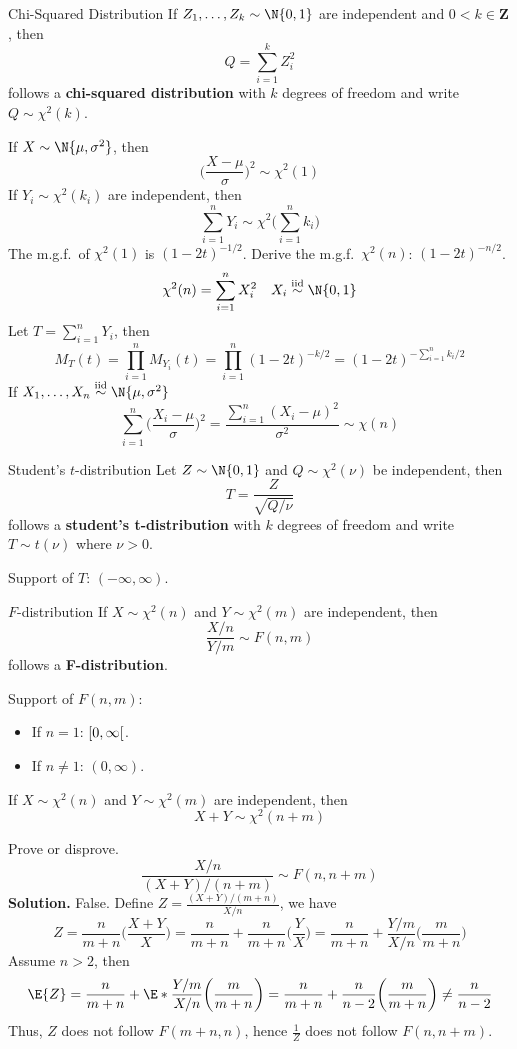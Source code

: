\begin{Definition}{Chi-Squared Distribution}{}
    If $ Z_1,\ldots,Z_k \sim \N{0,1} $ are independent
    and $ 0<k\in\mathbf{Z} $, then
    \[ Q=\sum_{i=1}^{k} Z_i^2 \]
    follows a \textbf{chi-squared distribution}
    with $ k $ degrees of freedom and write
    $ Q \sim \chi^2(k) $.
\end{Definition}
If $ X \sim \N{\mu,\sigma^2} $, then
\[ \biggl(\frac{X-\mu}{\sigma}\biggr)^2 \sim \chi^2(1)  \]
If $ Y_i \sim \chi^2(k_i) $ are independent, then
\[ \sum_{i=1}^{n} Y_i \sim \chi^2\biggl(\sum_{i=1}^{n} k_i\biggr) \]
The m.g.f.\ of $ \chi^2(1) $ is $ (1-2t)^{-1/2} $. Derive
the m.g.f.\ $ \chi^2(n) $: $ (1-2t)^{-n/2} $.
\[ \chi^2(n)=\sum_{i=1}^{n} X_i^2\quad X_i\stackrel{\text{iid}}{\sim}\N{0,1}\]
Let $ T=\sum_{i=1}^{n} Y_i $, then
\[
    M_T(t)
    =\prod_{i=1}^n M_{Y_i}(t)
    =\prod_{i=1}^n(1-2t)^{-k/2}
    =(1-2t)^{-\sum_{i=1}^{n} k_i/2}
\]
If $ X_1,\ldots,X_n\stackrel{\text{iid}}{\sim}\N{\mu,\sigma^2} $
\[ \sum_{i=1}^{n} \biggl(\frac{X_i-\mu}{\sigma}\biggr)^2=
    \frac{\sum_{i=1}^{n} (X_i-\mu)^2}{\sigma^2}\sim \chi(n)  \]
\begin{Definition}{Student's $ t $-distribution}{}
    Let $ Z \sim \N{0,1} $ and $ Q \sim \chi^2(\nu) $
    be independent, then
    \[ T=\frac{Z}{\sqrt{Q/\nu}}  \]
    follows a \textbf{student's t-distribution}
    with $ k $ degrees of freedom and write
    $ T \sim t(\nu) $ where $ \nu>0 $.

    Support of $ T $: $ (-\infty,\infty) $.
\end{Definition}
\begin{Definition}{$ F $-distribution}{}
    If $ X \sim \chi^2(n) $ and $ Y \sim \chi^2(m) $
    are independent, then
    \[ \frac{X/n}{Y/m} \sim F(n,m) \]
    follows a \textbf{F-distribution}.

    Support of $ F(n,m) $:
    \begin{itemize}
        \item If $ n=1 $: $ \interval[open right]{0}{\infty} $.
        \item If $ n\neq 1 $: $ (0,\infty) $.
    \end{itemize}
\end{Definition}
If $ X \sim \chi^2(n) $ and $ Y \sim \chi^2(m) $ are independent,
then
\[ X+Y \sim \chi^2(n+m) \]
\begin{Exercise}{}{}
    Prove or disprove.
    \[ \frac{X/n}{(X+Y)/(n+m)} \sim F(n,n+m) \]
    \textbf{Solution.} False. Define
    $ \displaystyle Z=\frac{(X+Y)/(m+n)}{X/n} $, we have
    \[ Z=\frac{n}{m+n} \biggl(\frac{X+Y}{X} \biggr)=
        \frac{n}{m+n} +\frac{n}{m+n}\biggl(\frac{Y}{X} \biggr)
        =\frac{n}{m+n} +\frac{Y/m}{X/n} \biggl(\frac{m}{m+n} \biggr) \]
    Assume $ n>2 $, then
    \[ \E{Z}=\frac{n}{m+n} +\E*{\frac{Y/m}{X/n}}\biggl(\frac{m}{m+n} \biggr)
        =\frac{n}{m+n}+\frac{n}{n-2} \bigg(\frac{m}{m+n} \biggr)\ne \frac{n}{n-2}  \]
    Thus, $ Z $ does not follow $ F(m+n,n) $, hence
    $ \displaystyle \frac{1}{Z} $ does not follow $ F(n,n+m) $.
\end{Exercise}
